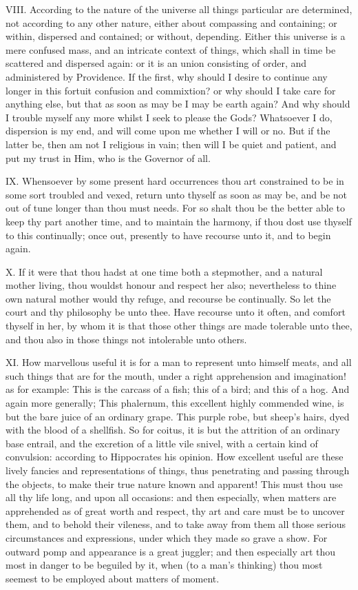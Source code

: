VIII. According to the nature of the universe all things particular are
determined, not according to any other nature, either about compassing and
containing; or within, dispersed and contained; or without, depending.
Either this universe is a mere confused mass, and an intricate context of
things, which shall in time be scattered and dispersed again: or it is an
union consisting of order, and administered by Providence. If the first,
why should I desire to continue any longer in this fortuit confusion and
commixtion? or why should I take care for anything else, but that as soon
as may be I may be earth again? And why should I trouble myself any more
whilst I seek to please the Gods? Whatsoever I do, dispersion is my end,
and will come upon me whether I will or no. But if the latter be, then am
not I religious in vain; then will I be quiet and patient, and put my
trust in Him, who is the Governor of all.

IX. Whensoever by some present hard occurrences thou art constrained to
be in some sort troubled and vexed, return unto thyself as soon as may be,
and be not out of tune longer than thou must needs. For so shalt thou be
the better able to keep thy part another time, and to maintain the
harmony, if thou dost use thyself to this continually; once out, presently
to have recourse unto it, and to begin again.

X. If it were that thou hadst at one time both a stepmother, and
a natural mother living, thou wouldst honour and respect her also;
nevertheless to thine own natural mother would thy refuge, and recourse be
continually. So let the court and thy philosophy be unto thee. Have
recourse unto it often, and comfort thyself in her, by whom it is that
those other things are made tolerable unto thee, and thou also in those
things not intolerable unto others.

XI. How marvellous useful it is for a man to represent unto himself
meats, and all such things that are for the mouth, under a right
apprehension and imagination! as for example: This is the carcass of a
fish; this of a bird; and this of a hog. And again more generally; This
phalernum, this excellent highly commended wine, is but the bare juice of
an ordinary grape. This purple robe, but sheep's hairs, dyed with the
blood of a shellfish. So for coitus, it is but the attrition of an
ordinary base entrail, and the excretion of a little vile snivel, with a
certain kind of convulsion: according to Hippocrates his opinion. How
excellent useful are these lively fancies and representations of things,
thus penetrating and passing through the objects, to make their true
nature known and apparent! This must thou use all thy life long, and upon
all occasions: and then especially, when matters are apprehended as of
great worth and respect, thy art and care must be to uncover them, and to
behold their vileness, and to take away from them all those serious
circumstances and expressions, under which they made so grave a show. For
outward pomp and appearance is a great juggler; and then especially art
thou most in danger to be beguiled by it, when (to a man's thinking) thou
most seemest to be employed about matters of moment.

